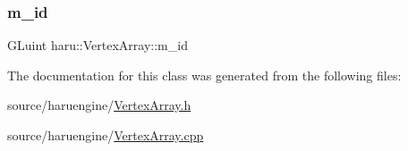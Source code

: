 \mbox{\label{classharu_1_1_vertex_array_a61e6c2025f2bb9da20280c6b607e4c22}} 
\subsubsection{\texorpdfstring{m\+\_\+id}{m\_id}}
{\footnotesize\ttfamily G\+Luint haru\+::\+Vertex\+Array\+::m\+\_\+id\hspace{0.3cm}{\ttfamily [private]}}



The documentation for this class was generated from the following files\+:\begin{DoxyCompactItemize}
\item 
source/haruengine/\mbox{\hyperlink{_vertex_array_8h}{Vertex\+Array.\+h}}\item 
source/haruengine/\mbox{\hyperlink{_vertex_array_8cpp}{Vertex\+Array.\+cpp}}\end{DoxyCompactItemize}
